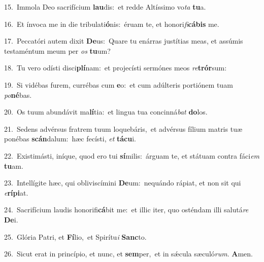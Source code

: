 {\numbfont\textcolor{\numbcolor}{15.}}~Immola Deo sacrifícium \textbf{lau}\-dis:~\star et redde Altíssimo vo\textit{ta} \textbf{tu}\-a.\par
{\numbfont\textcolor{\numbcolor}{16.}}~Et ínvoca me in die tribulati\-\textbf{ó}\-nis:~\star éruam te, et honori\-\textit{fi}\-\textbf{cá}\textbf{bis} me.\par
{\numbfont\textcolor{\numbcolor}{17.}}~Peccatóri autem dixit \textbf{De}\-us:~\star Quare tu enárras justítias meas, et assúmis testaméntum meum per \textit{os} \textbf{tu}\-um?\par
{\numbfont\textcolor{\numbcolor}{18.}}~Tu vero odísti disci\-\textbf{plí}\-nam:~\star et projecísti sermónes meos \textit{re}\-\textbf{trór}sum:\par
{\numbfont\textcolor{\numbcolor}{19.}}~Si vidébas furem, currébas cum \textbf{e}\-o:~\star et cum adúlteris portiónem tuam \textit{po}\-\textbf{né}bas.\par
{\numbfont\textcolor{\numbcolor}{20.}}~Os tuum abundávit ma\-\textbf{lí}\-tia:~\star et lingua tua concinná\textit{bat} \textbf{do}\-los.\par
{\numbfont\textcolor{\numbcolor}{21.}}~Sedens advérsus fratrem tuum loquebáris,~\dagger et advérsus fílium matris tuæ ponébas \textbf{scán}\-dalum:~\star hæc fecísti, \textit{et} \textbf{tá}\-\textbf{cu}i.\par
{\numbfont\textcolor{\numbcolor}{22.}}~Existimásti, iníque, quod ero tui \textbf{sí}\-milis:~\star árguam te, et státuam contra fáci\textit{em} \textbf{tu}\-am.\par
{\numbfont\textcolor{\numbcolor}{23.}}~Intellígite hæc, qui obliviscímini \textbf{De}\-um:~\star nequándo rápiat, et non sit qui \textit{e}\-\textbf{rí}\textbf{pi}at.\par
{\numbfont\textcolor{\numbcolor}{24.}}~Sacrifícium laudis honorifi\-\textbf{cá}\-bit me:~\star et illic iter, quo osténdam illi salutá\textit{re} \textbf{De}\-i.\par
{\numbfont\textcolor{\numbcolor}{25.}}~Glória Patri, et \textbf{Fí}\-lio,~\star et Spirítu\textit{i} \textbf{Sanc}\-to.\par
{\numbfont\textcolor{\numbcolor}{26.}}~Sicut erat in princípio, et nunc, et \textbf{sem}\-per,~\star et in sǽcula sæculó\-\textit{rum}\-. \textbf{A}\-men.\par
